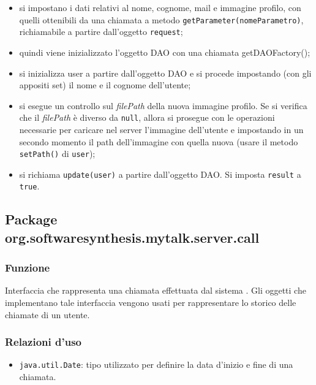 \begin{description}
\begin{itemize}
	\item si impostano i dati relativi al nome, cognome, mail e immagine profilo, con quelli ottenibili da una chiamata a metodo \texttt{getParameter(nomeParametro)}, richiamabile a partire dall'oggetto \texttt{request};
	\item quindi viene inizializzato l'oggetto DAO con una chiamata getDAOFactory();
	\item si inizializza user a partire dall'oggetto DAO e si procede impostando (con gli appositi set) il nome e il cognome dell'utente;
	\item si esegue un controllo sul \textit{filePath} della nuova immagine profilo. Se si verifica che il \textit{filePath} è diverso da \texttt{null}, allora si prosegue con le operazioni necessarie per caricare nel server l'immagine dell'utente e impostando in un secondo momento il path dell'immagine con quella nuova (usare il metodo \texttt{setPath()} di \texttt{user});
	\item si richiama \texttt{update(user)} a partire dall'oggetto DAO. Si imposta \texttt{result} a \texttt{true}.
\end{itemize}
	
\end{description}


\subsection{Package org.softwaresynthesis.mytalk.server.call}\label{sec:call}


\subsubsection*{Funzione}
Interfaccia che rappresenta una chiamata effettuata dal sistema \caName. Gli oggetti che implementano tale interfaccia vengono usati per rappresentare lo storico delle chiamate di un utente.

\subsubsection*{Relazioni d'uso}
\begin{itemize}
	\item \texttt{java.util.Date}: tipo utilizzato per definire la data d'inizio e fine di una chiamata.
\end{itemize}

